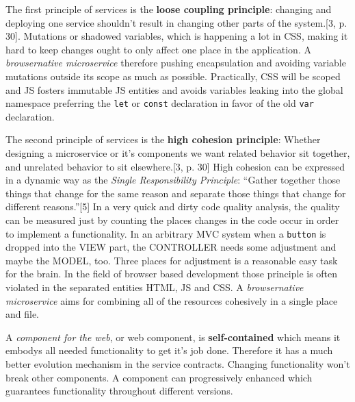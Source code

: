 \documentclass[]{article}
\begin{document}
The first principle of services is the \textbf{loose coupling
principle}: changing and deploying one service shouldn't result in
changing other parts of the system.{[}3, p. 30{]}. Mutations or shadowed
variables, which is happening a lot in CSS, making it hard to keep
changes ought to only affect one place in the application. A
\emph{browsernative microservice} therefore pushing encapsulation and
avoiding variable mutations outside its scope as much as possible.
Practically, CSS will be scoped and JS fosters immutable JS entities and
avoids variables leaking into the global namespace preferring the
\texttt{let} or \texttt{const} declaration in favor of the old
\texttt{var} declaration.

The second principle of services is the \textbf{high cohesion
principle}: Whether designing a microservice or it's components we want
related behavior sit together, and unrelated behavior to sit
elsewhere.{[}3, p. 30{]} High cohesion can be expressed in a dynamic way
as the \emph{Single Responsibility Principle}: ``Gather together those
things that change for the same reason and separate those things that
change for different reasons.''{[}5{]} In a very quick and dirty code
quality analysis, the quality can be measured just by counting the
places changes in the code occur in order to implement a functionality.
In an arbitrary MVC system when a \texttt{button} is dropped into the
VIEW part, the CONTROLLER needs some adjustment and maybe the MODEL,
too. Three places for adjustment is a reasonable easy task for the
brain. In the field of browser based development those principle is
often violated in the separated entities HTML, JS and CSS. A
\emph{browsernative microservice} aims for combining all of the
resources cohesively in a single place and file.

A \emph{component for the web}, or web component, is
\textbf{self-contained} which means it embodys all needed functionality
to get it's job done. Therefore it has a much better evolution mechanism
in the service contracts. Changing functionality won't break other
components. A component can progressively enhanced which guarantees
functionality throughout different versions.
\end{document}
